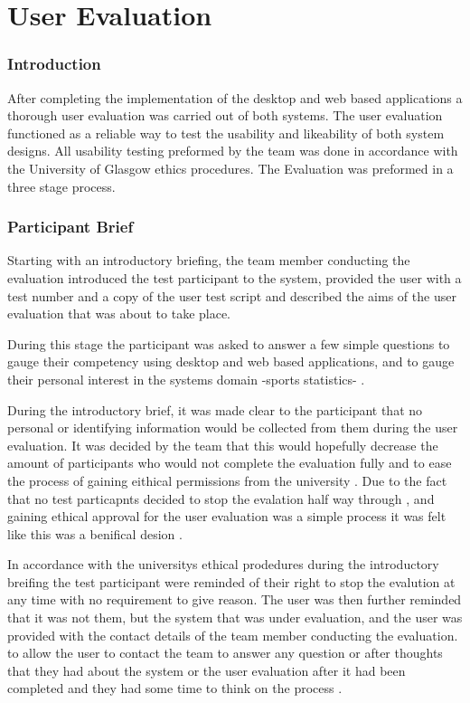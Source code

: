 \section{User Evaluation }

\subsubsection{Introduction}

After completing the implementation of the desktop and web based applications a thorough user evaluation was carried out of both systems. The user evaluation functioned as a reliable way to test the usability and likeability of both system designs. All usability testing preformed by the team was done in accordance with the University of Glasgow ethics procedures. The Evaluation was preformed in a three stage process. 


\subsubsection{ Participant Brief }

Starting with an introductory briefing, the team member conducting the evaluation introduced the test participant to the system, provided the user with a test number and a copy of the user test script and described the aims of the user evaluation that was about to take place.  

During this stage the participant was asked to answer a few simple questions to gauge their competency using desktop and web based applications, and to gauge their personal interest in the systems domain -sports statistics- .

 During the introductory brief, it was made clear to the participant that no personal or identifying information would be collected from them during the user evaluation.  It was decided by the team that this would hopefully decrease the amount of participants who would not complete the evaluation fully and to ease the process of gaining eithical permissions from the university . Due to the fact that no test particapnts decided to stop the evalation half way through , and gaining ethical approval for the user evaluation was a simple process it was felt like this was a benifical desion . 

In accordance with the universitys ethical prodedures during the introductory breifing the test participant were reminded of their right to stop the evalution at any time with no requirement to give reason. The user was then further reminded that it was not them, but the system that was under evaluation, and the user was provided with the contact details of the team member conducting the evaluation. to allow the user to contact the team to answer any question or after thoughts that they had about the system or the user evaluation after it had been completed and they had some time to think on the process .

